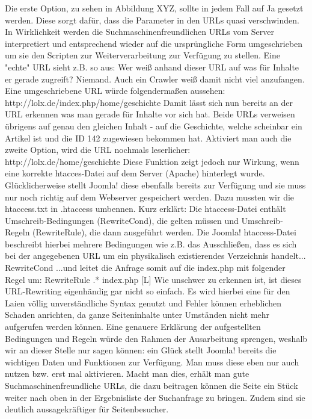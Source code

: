 Die erste Option, zu sehen in Abbildung XYZ, sollte in jedem Fall auf Ja gesetzt werden. Diese sorgt dafür, dass die Parameter in den URLs quasi verschwinden. In Wirklichkeit werden die Suchmaschinenfreundlichen URLs vom Server interpretiert und entsprechend wieder auf die ursprüngliche Form umgeschrieben um sie den Scripten zur Weiterverarbeitung zur Verfügung zu stellen. Eine "echte" URL sieht z.B. so aus:
Wer weiß anhand dieser URL auf was für Inhalte er gerade zugreift? Niemand. Auch ein Crawler weiß damit nicht viel anzufangen. Eine umgeschriebene URL würde folgendermaßen aussehen:
http://lolx.de/index.php/home/geschichte
Damit lässt sich nun bereits an der URL erkennen was man gerade für Inhalte vor sich hat. Beide URLs verweisen übrigens auf genau den gleichen Inhalt - auf die Geschichte, welche scheinbar ein Artikel ist und die ID 142 zugewiesen bekommen hat.
Aktiviert man auch die zweite Option, wird die URL nochmals leserlicher:
http://lolx.de/home/geschichte
Diese Funktion zeigt jedoch nur Wirkung, wenn eine korrekte htacces-Datei auf dem Server (Apache) hinterlegt wurde. Glücklicherweise stellt Joomla! diese ebenfalls bereits zur Verfügung und sie muss nur noch richtig auf dem Webserver gespeichert werden. Dazu mussten wir die htaccess.txt in .htaccess umbennen. Kurz erklärt: Die htaccess-Datei enthält Umschreib-Bedingungen (RewriteCond), die gelten müssen und Umschreib-Regeln (RewriteRule), die dann ausgeführt werden. Die Joomla! htaccess-Datei beschreibt hierbei mehrere Bedingungen wie z.B. das Ausschließen, dass es sich bei der angegebenen URL um ein physikalisch existierendes Verzeichnis handelt...
RewriteCond %
...und leitet die Anfrage somit auf die index.php mit folgender Regel um:
RewriteRule .* index.php [L]
Wie unschwer zu erkennen ist, ist dieses URL-Rewriting eigenhändig gar nicht so einfach. Es wird hierbei eine für den Laien völlig unverständliche Syntax genutzt und Fehler können erheblichen Schaden anrichten, da ganze Seiteninhalte unter Umständen nicht mehr aufgerufen werden können.
Eine genauere Erklärung der aufgestellten Bedingungen und Regeln würde den Rahmen der Ausarbeitung sprengen, weshalb wir an dieser Stelle nur sagen können: ein Glück stellt Joomla! bereits die wichtigen Daten und Funktionen zur Verfügung. Man muss diese eben nur auch nutzen bzw. erst mal aktivieren. Macht man dies, erhält man gute Suchmaschinenfreundliche URLs, die dazu beitragen können die Seite ein Stück weiter nach oben in der Ergebnisliste der Suchanfrage zu bringen. Zudem sind sie deutlich aussagekräftiger für Seitenbesucher.
%

